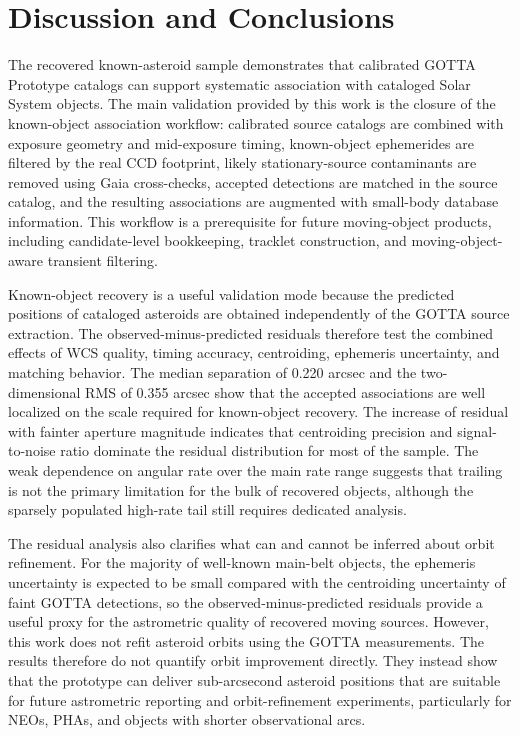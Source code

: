 \documentclass[referee]{raa}
\begin{document}
\FloatBarrier

\section{Discussion and Conclusions}
\label{sec:discussion}

The recovered known-asteroid sample demonstrates that calibrated GOTTA Prototype catalogs can support systematic association with cataloged Solar System objects. The main validation provided by this work is the closure of the known-object association workflow: calibrated source catalogs are combined with exposure geometry and mid-exposure timing, known-object ephemerides are filtered by the real CCD footprint, likely stationary-source contaminants are removed using Gaia cross-checks, accepted detections are matched in the source catalog, and the resulting associations are augmented with small-body database information. This workflow is a prerequisite for future moving-object products, including candidate-level bookkeeping, tracklet construction, and moving-object-aware transient filtering.

Known-object recovery is a useful validation mode because the predicted positions of cataloged asteroids are obtained independently of the GOTTA source extraction. The observed-minus-predicted residuals therefore test the combined effects of WCS quality, timing accuracy, centroiding, ephemeris uncertainty, and matching behavior. The median separation of 0.220 arcsec and the two-dimensional RMS of 0.355 arcsec show that the accepted associations are well localized on the scale required for known-object recovery. The increase of residual with fainter aperture magnitude indicates that centroiding precision and signal-to-noise ratio dominate the residual distribution for most of the sample. The weak dependence on angular rate over the main rate range suggests that trailing is not the primary limitation for the bulk of recovered objects, although the sparsely populated high-rate tail still requires dedicated analysis.

The residual analysis also clarifies what can and cannot be inferred about orbit refinement. For the majority of well-known main-belt objects, the ephemeris uncertainty is expected to be small compared with the centroiding uncertainty of faint GOTTA detections, so the observed-minus-predicted residuals provide a useful proxy for the astrometric quality of recovered moving sources. However, this work does not refit asteroid orbits using the GOTTA measurements. The results therefore do not quantify orbit improvement directly. They instead show that the prototype can deliver sub-arcsecond asteroid positions that are suitable for future astrometric reporting and orbit-refinement experiments, particularly for NEOs, PHAs, and objects with shorter observational arcs.
\end{document}
